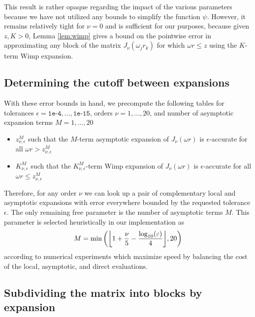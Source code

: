 This result is rather opaque regarding the impact of the various parameters
because we have not utilized any bounds to simplify the function $\psi$.
However, it remains relatively tight for $\nu = 0$ and is sufficient for our
purposes, because given $z, K > 0$, Lemma \ref{lem:wimp} gives a bound on the
pointwise error in approximating any block of the matrix $J_\nu(\omega_j r_k)$
for which $\omega r \leq z$ using the $K$-term Wimp expansion. 


\subsection{Determining the cutoff between expansions}

With these error bounds in hand, we precompute the following tables for
tolerances $\epsilon = \texttt{1e-4}, \dots, \texttt{1e-15}$, orders $\nu = 1,
\dots, 20$, and number of asymptotic expansion terms $M = 1, \dots, 20$
\begin{itemize}
    \item $z_{\nu, \epsilon}^M$ such that the $M$-term asymptotic expansion of
    $J_\nu(\omega r)$ is $\epsilon$-accurate for all $\omega r > z_{\nu,
    \epsilon}^M$
    \item $K_{\nu, \epsilon}^M$ such that the $K_{\nu, \epsilon}^M$-term Wimp
    expansion of $J_\nu(\omega r)$ is $\epsilon$-accurate for all $\omega r \leq
    z_{\nu, \epsilon}^M$
\end{itemize}
Therefore, for any order $\nu$ we can look up a pair of complementary local and
asymptotic expansions with error everywhere bounded by the requested tolerance
$\epsilon$. The only remaining free parameter is the number of asymptotic terms
$M$. This parameter is selected heuristically in our implementation as 
\begin{equation}
    M = \min\left({\left\lfloor 1 + \frac{\nu}{5} - \frac{\log_{10}(\varepsilon)}{4} \right\rfloor}, 20\right)
\end{equation}
according to numerical experiments which maximize speed by balancing the cost of
the local, asymptotic, and direct evaluations.

\subsection{Subdividing the matrix into blocks by expansion}

